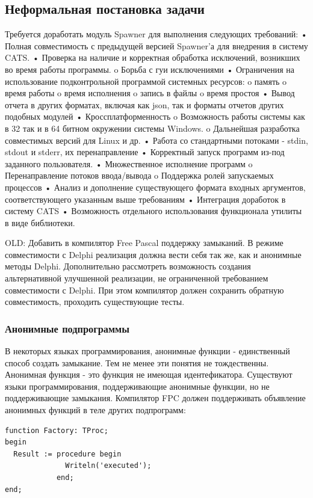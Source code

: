 \documentclass{imcs}
\begin{document}
\subsection{Неформальная постановка задачи}

Требуется доработать модуль Spawner для выполнения следующих требований:
•	Полная совместимость с предыдущей версией Spawner’а для внедрения в систему CATS.
•	Проверка на наличие и корректная обработка исключений, возникших во время работы программы.
o	Борьба с гуи исключениями
•	Ограничения на использование подконтрольной программой системных ресурсов:
o	память
o	время работы
o	время исполнения
o	запись в файлы
o	время простоя
•	Вывод отчета в других форматах, включая как json, так и форматы отчетов других подобных модулей
•	Кроссплатформенность
o	Возможность работы системы как в 32 так и в 64 битном окружении системы Windows.
o	Дальнейшая разработка совместимых версий для Linux и др.
•	Работа со стандартными потоками - stdin, stdout и stderr, их перенаправление
•	Корректный запуск программ из-под заданного пользователя.
•	Множественное исполнение программ
o	Перенаправление потоков ввода/вывода
o	Поддержка ролей запускаемых процессов
•	Анализ и дополнение существующего формата входных аргументов, соответствующего указанным выше требованиям
•	Интеграция доработок в систему CATS
•	Возможность отдельного использования функционала утилиты в виде библиотеки.

\iffalse OLD:
Добавить в компилятор Free Pascal поддержку замыканий. В режиме совместимости с 
Delphi реализация должна вести себя так же, как и анонимные методы
Delphi. Дополнительно рассмотреть возможность создания альтернативной улучшенной
реализации, не ограниченной требованием совместимости с Delphi.
При этом компилятор должен сохранить обратную совместимость, проходить существующие тесты. 

\subsubsection{Анонимные подпрограммы}

В некоторых языках программирования, анонимные функции - единственный
способ создать замыкание. Тем не менее эти понятия не тождественны.
Анонимная функция - это функция не имеющая идентефикатора. Существуют
языки программирования, поддерживающие анонимные функции, но не
поддерживающие замыкания. Компилятор FPC должен поддерживать
объявление анонимных функций в теле других подпрограмм:
\begin{lstlisting}
function Factory: TProc;
begin
  Result := procedure begin
              Writeln('executed');
            end;
end;
\end{lstlisting}
\end{document}
